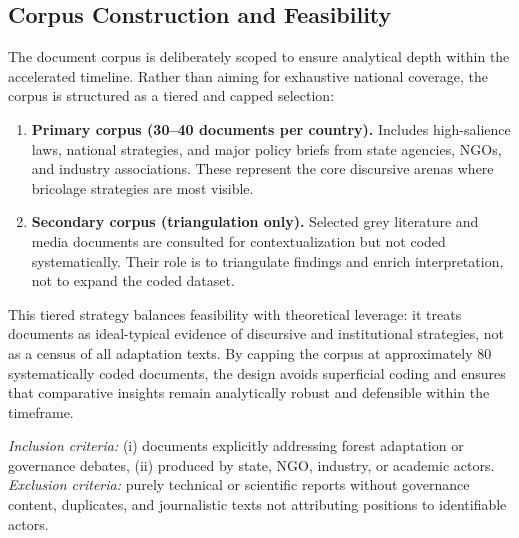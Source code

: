 \subsection*{Corpus Construction and Feasibility}

The document corpus is deliberately scoped to ensure analytical depth within the 
accelerated timeline. Rather than aiming for exhaustive national coverage, the corpus 
is structured as a tiered and capped selection:

\begin{enumerate}
    \item \textbf{Primary corpus (30--40 documents per country).}  
    Includes high-salience laws, national strategies, and major policy briefs 
    from state agencies, NGOs, and industry associations. These represent the 
    core discursive arenas where bricolage strategies are most visible.

    \item \textbf{Secondary corpus (triangulation only).}  
    Selected grey literature and media documents are consulted for contextualization 
    but not coded systematically. Their role is to triangulate findings and enrich 
    interpretation, not to expand the coded dataset.
\end{enumerate}

This tiered strategy balances feasibility with theoretical leverage: it treats 
documents as ideal-typical evidence of discursive and institutional strategies, 
not as a census of all adaptation texts. By capping the corpus at approximately 
80 systematically coded documents, the design avoids superficial coding and 
ensures that comparative insights remain analytically robust and defensible 
within the timeframe.

\textit{Inclusion criteria:} (i) documents explicitly addressing forest adaptation 
or governance debates, (ii) produced by state, NGO, industry, or academic actors.  
\textit{Exclusion criteria:} purely technical or scientific reports without 
governance content, duplicates, and journalistic texts not attributing positions 
to identifiable actors.


